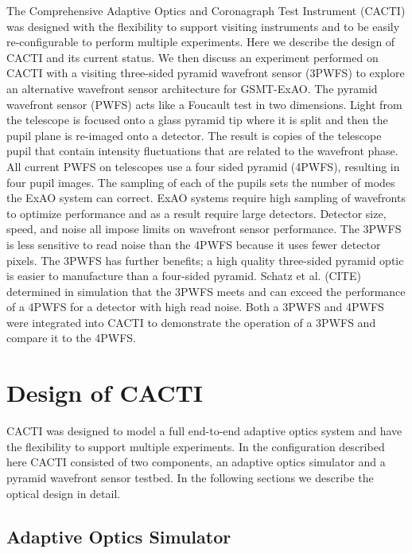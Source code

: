 \documentclass[12pt]{spieman}  %
\begin{document}
\begin{spacing}{2}
The Comprehensive Adaptive Optics and Coronagraph Test Instrument (CACTI) was designed with the flexibility to support visiting instruments and to be easily re-configurable to perform multiple experiments. Here we describe the design of  CACTI and its current status. We then discuss an experiment performed on CACTI with a visiting three-sided pyramid wavefront sensor (3PWFS) to explore an alternative wavefront sensor architecture for GSMT-ExAO. The pyramid wavefront sensor (PWFS) acts like a Foucault test in two dimensions. Light from the telescope is focused onto a glass pyramid tip where it is split and then the pupil plane is re-imaged onto a detector. The result is copies of the telescope pupil that contain intensity fluctuations that are related to the wavefront phase. All current PWFS on telescopes use a four sided pyramid (4PWFS), resulting in four pupil images. The sampling of each of the pupils sets the number of modes the ExAO system can correct. ExAO systems require high sampling of wavefronts to optimize performance and as a result require large detectors. Detector size, speed, and noise all impose limits on wavefront sensor performance. The 3PWFS is less sensitive to read noise than the 4PWFS because it uses fewer detector pixels. The 3PWFS has further benefits; a high quality three-sided pyramid optic is easier to manufacture than a four-sided pyramid. Schatz et al. (CITE) determined in simulation that the 3PWFS meets and can exceed the performance of a 4PWFS for a detector with high read noise.  Both a 3PWFS and 4PWFS were integrated into  CACTI to demonstrate the operation of a 3PWFS and compare it to the 4PWFS. 

\section{Design of CACTI}
CACTI was designed to model a full end-to-end adaptive optics system and have the flexibility to support multiple experiments. In the configuration described here CACTI consisted of two components, an adaptive optics simulator and a pyramid wavefront sensor testbed. In the following sections we describe the optical design in detail. 



\subsection{Adaptive Optics Simulator}


\end{spacing}
\end{document}
